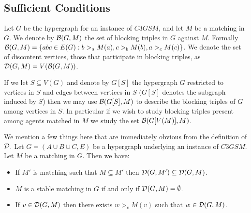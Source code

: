 \subsection{Sufficient Conditions}\label{subsec:sufficient}
\begin{definition}
Let $G$ be the hypergraph for an instance of $C3GSM$, and let $M$ be a matching in $G$. We denote by $\mathcal{B}(G,M)$ the set of blocking triples in $G$ against $M$. Formally $\mathcal{B}(G,M) = \{abc \in E(G): b>_a M(a), c>_b M(b), a>_c M(c)\}$. We denote the set of discontent vertices, those that participate in blocking triples, as $\mathcal{D}(G,M) = V(\mathcal{B}(G,M))$.
\end{definition}
\begin{note}
If we let $S \subseteq V(G)$ and denote by $G[S]$ the hypergraph $G$ restricted to vertices in $S$ and edges between vertices in $S$ ($G[S]$ denotes the subgraph induced by $S$) then we may use $\mathcal{B}(G[S],M)$ to describe the blocking triples of $G$ among vertices in $S$. In particular if we wish to study blocking triples present among agents matched in $M$ we study the set $\mathcal{B}(G[V(M)], M)$.
\end{note}
\begin{note}
We mention a few things here that are immediately obvious from the definition of $\mathcal{D}$. Let $G=(A\cup B \cup C, E)$ be a hypergraph underlying an instance of $C3GSM$. Let $M$ be a matching in $G$. Then we have:
\begin{itemize}
\item If $M'$ is matching such that $M \subseteq M'$ then $\mathcal{D}(G,M') \subseteq \mathcal{D}(G,M)$.
\item $M$ is a stable matching in $G$ if and only if $\mathcal{D}(G, M) = \emptyset$.
\item If $v \in \mathcal{D}(G,M)$ then there exists $w >_v M(v)$ such that $w \in \mathcal{D}(G,M)$.
\end{itemize}
\end{note}

